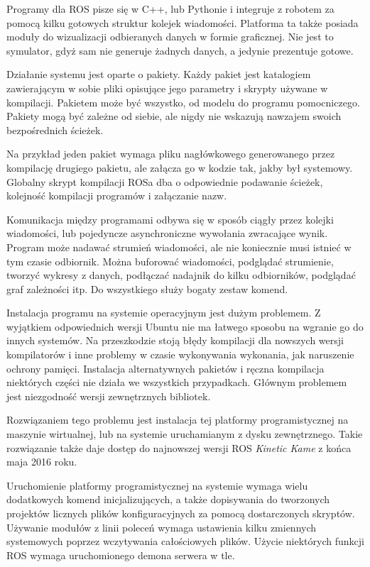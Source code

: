 Programy dla ROS pisze się w C++, lub Pythonie i integruje z robotem za pomocą kilku gotowych struktur kolejek wiadomości.
Platforma ta także posiada moduły do wizualizacji odbieranych danych w formie graficznej.
Nie jest to symulator, gdyż sam nie generuje żadnych danych, a jedynie prezentuje gotowe.

Działanie systemu jest oparte o pakiety. Każdy pakiet jest katalogiem zawierającym w sobie pliki opisujące jego parametry i skrypty używane w kompilacji.
Pakietem może być wszystko, od modelu do programu pomocniczego.
Pakiety mogą być zależne od siebie, ale nigdy nie wskazują nawzajem swoich bezpośrednich ścieżek.

Na przykład jeden pakiet wymaga pliku nagłówkowego generowanego przez kompilację drugiego pakietu, ale załącza go w kodzie tak, jakby był systemowy.
Globalny skrypt kompilacji ROSa dba o odpowiednie podawanie ścieżek, kolejność kompilacji programów i załączanie nazw.

Komunikacja między programami odbywa się w sposób ciągły przez kolejki wiadomości, lub pojedyncze asynchroniczne wywołania zwracające wynik.
Program może nadawać strumień wiadomości, ale nie koniecznie musi istnieć w tym czasie odbiornik.
Można buforować wiadomości, podglądać strumienie, tworzyć wykresy z danych, podłączać nadajnik do kilku odbiorników, podglądać graf zależności itp.
Do wszystkiego służy bogaty zestaw komend.

Instalacja programu na systemie operacyjnym jest dużym problemem.
Z wyjątkiem odpowiednich wersji Ubuntu nie ma łatwego sposobu na wgranie go do innych systemów.
Na przeszkodzie stoją błędy kompilacji dla nowszych wersji kompilatorów i inne problemy w czasie wykonywania wykonania, jak naruszenie ochrony pamięci. 
Instalacja alternatywnych pakietów i ręczna kompilacja niektórych części nie działa we wszystkich przypadkach.
Głównym problemem jest niezgodność wersji zewnętrznych bibliotek.

Rozwiązaniem tego problemu jest instalacja tej platformy programistycznej na maszynie wirtualnej, lub na systemie uruchamianym z dysku zewnętrznego. 
Takie rozwiązanie także daje dostęp do najnowszej wersji ROS \emph{Kinetic Kame} z końca maja 2016 roku.

Uruchomienie platformy programistycznej na systemie wymaga wielu dodatkowych komend inicjalizujących, a także dopisywania do tworzonych projektów licznych plików konfiguracyjnych za pomocą dostarczonych skryptów.
Używanie modułów z linii poleceń wymaga ustawienia kilku zmiennych systemowych poprzez wczytywania całościowych plików.
Użycie niektórych funkcji ROS wymaga uruchomionego demona serwera w tle.

